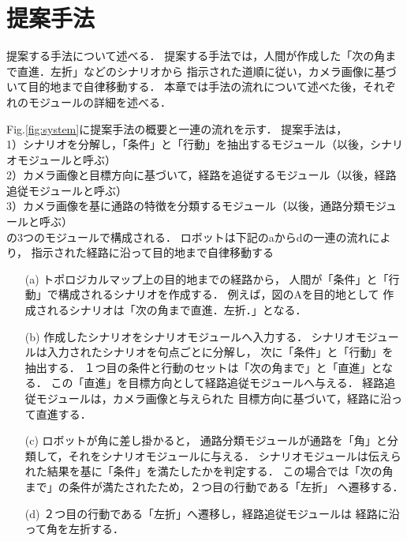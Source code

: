 \documentclass{sice-si}
\begin{document}
\section{提案手法}
提案する手法について述べる．
提案する手法では，人間が作成した「次の角まで直進．左折」などのシナリオから
指示された道順に従い，カメラ画像に基づいて目的地まで自律移動する．
本章では手法の流れについて述べた後，それぞれのモジュールの詳細を述べる．
\par
Fig.\ref{fig:system}に提案手法の概要と一連の流れを示す．
提案手法は，\\
1）シナリオを分解し，「条件」と「行動」を抽出するモジュール（以後，シナリオモジュールと呼ぶ）\\
2）カメラ画像と目標方向に基づいて，経路を追従するモジュール（以後，経路追従モジュールと呼ぶ）\\
3）カメラ画像を基に通路の特徴を分類するモジュール（以後，通路分類モジュールと呼ぶ）\\
の3つのモジュールで構成される．
ロボットは下記のaからdの一連の流れにより，
指示された経路に沿って目的地まで自律移動する
\begin{enumerate}
    \item [(a)] トポロジカルマップ上の目的地までの経路から，
    人間が「条件」と「行動」で構成されるシナリオを作成する．
    例えば，図のAを目的地として
    作成されるシナリオは「次の角まで直進．左折．」となる．
    \item [(b)] 作成したシナリオをシナリオモジュールへ入力する．
    シナリオモジュールは入力されたシナリオを句点ごとに分解し，
    次に「条件」と「行動」を抽出する．
    １つ目の条件と行動のセットは「次の角まで」と「直進」となる．
    この「直進」を目標方向として経路追従モジュールへ与える．
    経路追従モジュールは，カメラ画像と与えられた
    目標方向に基づいて，経路に沿って直進する．
    \item [(c)] ロボットが角に差し掛かると，
    通路分類モジュールが通路を「角」と分類して，それをシナリオモジュールに与える．
    シナリオモジュールは伝えられた結果を基に「条件」を満たしたかを判定する．
    この場合では「次の角まで」の条件が満たされたため，２つ目の行動である「左折」
    へ遷移する．
    \item [(d)]２つ目の行動である「左折」へ遷移し，経路追従モジュールは
    経路に沿って角を左折する．
\end{enumerate}
\end{document}
